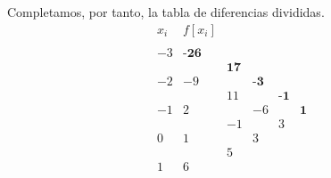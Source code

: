 \begin{ejercicio}
\begin{enumerate}
        Completamos, por tanto, la tabla de diferencias divididas.
        \begin{equation*}
            \begin{array}{c|cccccc}
                x_i & f[x_i] \\
                \\
                -3 & \textbf{-26} \\
                && \textbf{17}\\
                -2 & -9 && \textbf{-3}\\
                && 11&&\textbf{-1}\\
                -1 & 2 && -6 && \textbf{1}\\
                && -1 && 3\\
                0 & 1 && 3\\
                && 5\\
                1 & 6\\
            \end{array}
        \end{equation*}
    \end{enumerate}
\end{ejercicio}

